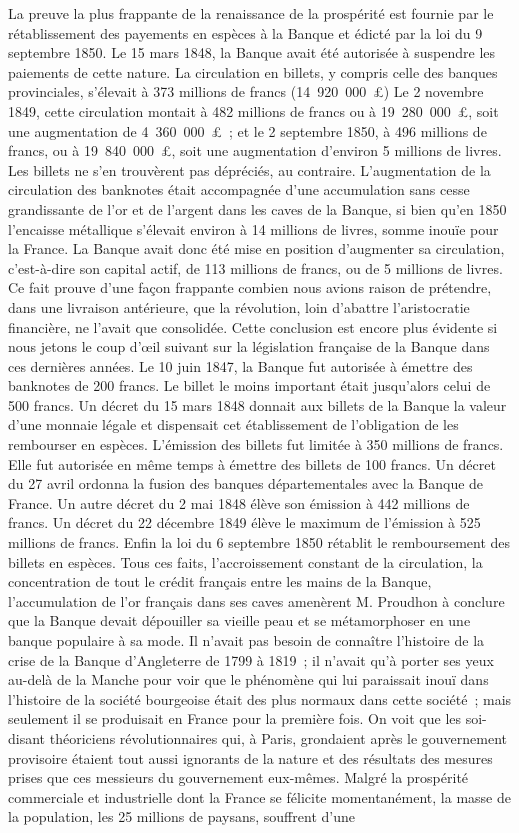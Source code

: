 \documentclass[french,twoside]{book} %
\begin{document}
La preuve la plus frappante de la renaissance de la prospérité est fournie par le rétablissement des payements en espèces à la Banque et édicté par la loi du 9 septembre 1850. Le 15 mars 1848, la Banque avait été autorisée à suspendre les paiements de cette nature. La circulation en billets, y compris celle des banques provinciales, s’élevait à 373 millions de francs (14 920 000 £) Le 2 novembre 1849, cette circulation montait à 482 millions de francs ou à 19 280 000 £, soit une augmentation de 4 360 000 £ ; et le 2 septembre 1850, à 496 millions de francs, ou à 19 840 000 £, soit une augmentation d’environ 5 millions de livres. Les billets ne s’en trouvèrent pas dépréciés, au contraire. L’augmentation de la circulation des banknotes était accompagnée d’une accumulation sans cesse grandissante de l’or et de l’argent dans les caves de la Banque, si bien qu’en 1850 l’encaisse métallique s’élevait environ à 14 millions de livres, somme inouïe pour la France. La Banque avait donc été mise en position d’augmenter sa circulation, c’est-à-dire son capital actif, de 113 millions de francs, ou de 5 millions de livres. Ce fait prouve d’une façon frappante combien nous avions raison de prétendre, dans une livraison antérieure, que la révolution, loin d’abattre l’aristocratie financière, ne l’avait que consolidée. Cette conclusion est encore plus évidente si nous jetons le coup d’œil suivant sur la législation française de la Banque dans ces dernières années. Le 10 juin 1847, la Banque fut autorisée à émettre des banknotes de 200 francs. Le billet le moins important était jusqu’alors celui de 500 francs. Un décret du 15 mars 1848 donnait aux billets de la Banque la valeur d’une monnaie légale et dispensait cet établissement de l’obligation de les rembourser en espèces. L’émission des billets fut limitée à 350 millions de francs. Elle fut autorisée en même temps à émettre des billets de 100 francs. Un décret du 27 avril ordonna la fusion des banques départementales avec la Banque de France. Un autre décret du 2 mai 1848 élève son émission à 442 millions de francs. Un décret du 22 décembre 1849 élève le maximum de l’émission à 525 millions de francs. Enfin la loi du 6 septembre 1850 rétablit le remboursement des billets en espèces. Tous ces faits, l’accroissement constant de la circulation, la concentration de tout le crédit français entre les mains de la Banque, l’accumulation de l’or français dans ses caves amenèrent M. Proudhon à conclure que la Banque devait dépouiller sa vieille peau et se métamorphoser en une banque populaire à sa mode. Il n’avait pas besoin de connaître l’histoire de la crise de la Banque d’Angleterre de 1799 à 1819 ; il n’avait qu’à porter ses yeux au-delà de la Manche pour voir que le phénomène qui lui paraissait inouï dans l’histoire de la société bourgeoise était des plus normaux dans cette société ; mais seulement il se produisait en France pour la première fois. On voit que les soi-disant théoriciens révolutionnaires qui, à Paris, grondaient après le gouvernement provisoire étaient tout aussi ignorants de la nature et des résultats des mesures prises que ces messieurs du gouvernement eux-mêmes. Malgré la prospérité commerciale et industrielle dont la France se félicite momentanément, la masse de la population, les 25 millions de paysans, souffrent d’une 
\end{document}
